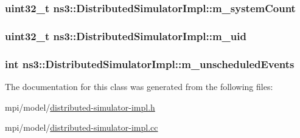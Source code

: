 \subsubsection[{\texorpdfstring{m\+\_\+system\+Count}{m_systemCount}}]{\setlength{\rightskip}{0pt plus 5cm}uint32\+\_\+t ns3\+::\+Distributed\+Simulator\+Impl\+::m\+\_\+system\+Count\hspace{0.3cm}{\ttfamily [private]}}\hypertarget{classns3_1_1DistributedSimulatorImpl_acc5d9ac05b8d3d9876b327aaabe5607e}{}\label{classns3_1_1DistributedSimulatorImpl_acc5d9ac05b8d3d9876b327aaabe5607e}
\subsubsection[{\texorpdfstring{m\+\_\+uid}{m_uid}}]{\setlength{\rightskip}{0pt plus 5cm}uint32\+\_\+t ns3\+::\+Distributed\+Simulator\+Impl\+::m\+\_\+uid\hspace{0.3cm}{\ttfamily [private]}}\hypertarget{classns3_1_1DistributedSimulatorImpl_a918c24f35d9579a75f064b3a3f81d165}{}\label{classns3_1_1DistributedSimulatorImpl_a918c24f35d9579a75f064b3a3f81d165}
\subsubsection[{\texorpdfstring{m\+\_\+unscheduled\+Events}{m_unscheduledEvents}}]{\setlength{\rightskip}{0pt plus 5cm}int ns3\+::\+Distributed\+Simulator\+Impl\+::m\+\_\+unscheduled\+Events\hspace{0.3cm}{\ttfamily [private]}}\hypertarget{classns3_1_1DistributedSimulatorImpl_ab02d06ce1c42a073c45b5ab0ed8d45d6}{}\label{classns3_1_1DistributedSimulatorImpl_ab02d06ce1c42a073c45b5ab0ed8d45d6}


The documentation for this class was generated from the following files\+:\begin{DoxyCompactItemize}
\item 
mpi/model/\hyperlink{distributed-simulator-impl_8h}{distributed-\/simulator-\/impl.\+h}\item 
mpi/model/\hyperlink{distributed-simulator-impl_8cc}{distributed-\/simulator-\/impl.\+cc}\end{DoxyCompactItemize}
